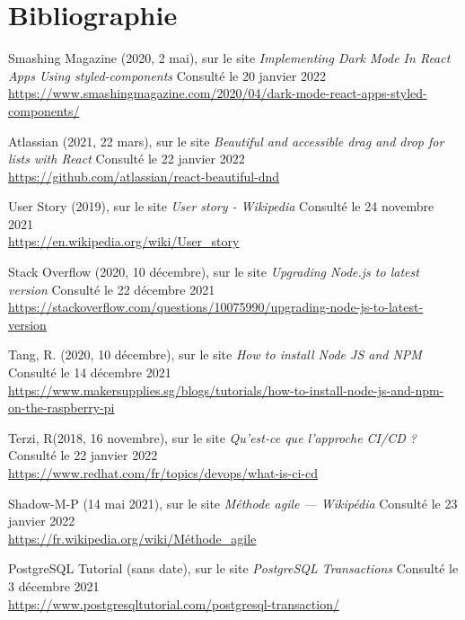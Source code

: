 \section{Bibliographie}

\renewcommand{\section}[2]{}%
\begin{thebibliography}{}


Smashing Magazine (2020, 2 mai), sur le site \textit{Implementing Dark Mode In React Apps Using styled-components} Consulté le 20 janvier 2022
\\\url{https://www.smashingmagazine.com/2020/04/dark-mode-react-apps-styled-components/}

Atlassian (2021, 22 mars), sur le site \textit{Beautiful and accessible drag and drop for lists with React} Consulté le 22 janvier 2022
\\\url{ https://github.com/atlassian/react-beautiful-dnd}

User Story (2019), sur le site \textit{User story - Wikipedia} Consulté le 24 novembre 2021
\\\url{https://en.wikipedia.org/wiki/User_story}

Stack Overflow (2020, 10 décembre), sur le site \textit{Upgrading Node.js to latest version} Consulté le 22 décembre 2021
\\\url{https://stackoverflow.com/questions/10075990/upgrading-node-js-to-latest-version}

Tang, R. (2020, 10 décembre), sur le site \textit{How to install Node JS and NPM } Consulté le 14 décembre 2021
\\\url{https://www.makersupplies.sg/blogs/tutorials/how-to-install-node-js-and-npm-on-the-raspberry-pi}

Terzi, R(2018, 16 novembre), sur le site \textit{Qu'est-ce que l'approche CI/CD ?} Consulté le 22 janvier 2022
\\\url{https://www.redhat.com/fr/topics/devops/what-is-ci-cd}

Shadow-M-P (14 mai 2021), sur le site \textit{Méthode agile — Wikipédia} Consulté le 23 janvier 2022
\\\url{https://fr.wikipedia.org/wiki/Méthode_agile}

PostgreSQL Tutorial (sans date), sur le site \textit{PostgreSQL Transactions} Consulté le 3 décembre 2021
\\\url{https://www.postgresqltutorial.com/postgresql-transaction/}


\end{thebibliography}
